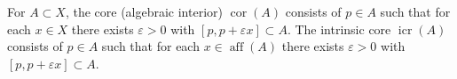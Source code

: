 For $A \subset X$, the core (algebraic interior) $\operatorname{cor}(A)$ consists of $p \in A$ such that for each $x \in X$ there exists $\varepsilon > 0$ with $[p, p + \varepsilon x] \subset A$. The intrinsic core $\operatorname{icr}(A)$ consists of $p \in A$ such that for each $x \in \operatorname{aff}(A)$ there exists $\varepsilon > 0$ with $[p, p + \varepsilon x] \subset A$.